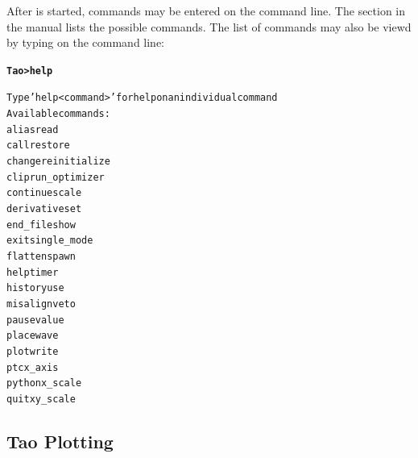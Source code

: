 \documentclass{hitec}
\begin{document}
After \tao is started, commands may be entered on the command line. The section
\tao {} in the \tao manual lists the possible commands. The list
of commands may also be viewd by typing  on the command line:
\begin{alltt}
  {\normalfont\textbf{Tao> help}}

  Type 'help <command>' for help on an individual command
  Available commands:
    alias                             read
    call                              restore
    change                            reinitialize
    clip                              run_optimizer
    continue                          scale
    derivative                        set
    end_file                          show
    exit                              single_mode
    flatten                           spawn
    help                              timer
    history                           use
    misalign                          veto
    pause                             value
    place                             wave
    plot                              write
    ptc                               x_axis
    python                            x_scale
    quit                              xy_scale
\end{alltt}

\subsection{Tao Plotting}
\end{document}

